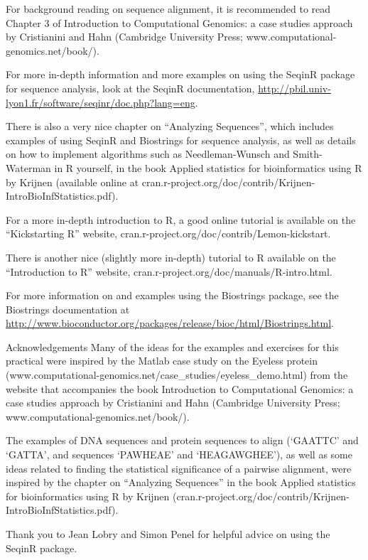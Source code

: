 \documentclass[
]{book}
\begin{document}
For background reading on sequence alignment, it is recommended to read Chapter 3 of Introduction to Computational Genomics: a case studies approach by Cristianini and Hahn (Cambridge University Press; www.computational-genomics.net/book/).

For more in-depth information and more examples on using the SeqinR package for sequence analysis, look at the SeqinR documentation, \url{http://pbil.univ-lyon1.fr/software/seqinr/doc.php?lang=eng}.

There is also a very nice chapter on ``Analyzing Sequences'', which includes examples of using SeqinR and Biostrings for sequence analysis, as well as details on how to implement algorithms such as Needleman-Wunsch and Smith-Waterman in R yourself, in the book Applied statistics for bioinformatics using R by Krijnen (available online at cran.r-project.org/doc/contrib/Krijnen-IntroBioInfStatistics.pdf).

For a more in-depth introduction to R, a good online tutorial is available on the ``Kickstarting R'' website, cran.r-project.org/doc/contrib/Lemon-kickstart.

There is another nice (slightly more in-depth) tutorial to R available on the ``Introduction to R'' website, cran.r-project.org/doc/manuals/R-intro.html.

For more information on and examples using the Biostrings package, see the Biostrings documentation at \url{http://www.bioconductor.org/packages/release/bioc/html/Biostrings.html}.

Acknowledgements
Many of the ideas for the examples and exercises for this practical were inspired by the Matlab case study on the Eyeless protein (www.computational-genomics.net/case\_studies/eyeless\_demo.html) from the website that accompanies the book Introduction to Computational Genomics: a case studies approach by Cristianini and Hahn (Cambridge University Press; www.computational-genomics.net/book/).

The examples of DNA sequences and protein sequences to align (`GAATTC' and `GATTA', and sequences `PAWHEAE' and `HEAGAWGHEE'), as well as some ideas related to finding the statistical significance of a pairwise alignment, were inspired by the chapter on ``Analyzing Sequences'' in the book Applied statistics for bioinformatics using R by Krijnen (cran.r-project.org/doc/contrib/Krijnen-IntroBioInfStatistics.pdf).

Thank you to Jean Lobry and Simon Penel for helpful advice on using the SeqinR package.
\end{document}
